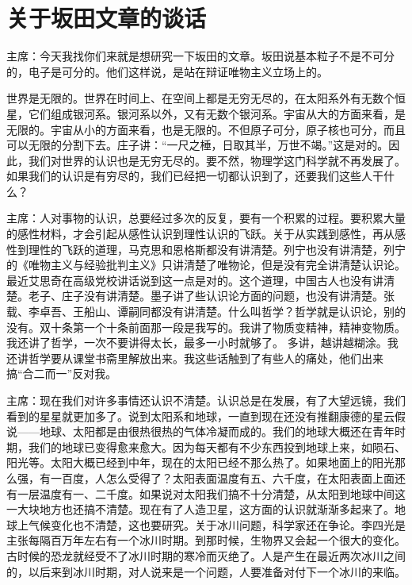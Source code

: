 \section[关于坂田文章的谈话（一九六四年八月二十四日）]{关于坂田文章的谈话}

主席：今天我找你们来就是想研究一下坂田的文章。坂田说基本粒子不是不可分的，电子是可分的。他们这样说，是站在辩证唯物主义立场上的。

世界是无限的。世界在时间上、在空间上都是无穷无尽的，在太阳系外有无数个恒星，它们组成银河系。银河系以外，又有无数个银河系。宇宙从大的方面来看，是无限的。宇宙从小的方面来看，也是无限的。不但原子可分，原子核也可分，而且可以无限的分割下去。庄子讲：“一尺之棰，日取其半，万世不竭。”这是对的。因此，我们对世界的认识也是无穷无尽的。要不然，物理学这门科学就不再发展了。如果我们的认识是有穷尽的，我们已经把一切都认识到了，还要我们这些人干什么？

主席：人对事物的认识，总要经过多次的反复，要有一个积累的过程。要积累大量的感性材料，才会引起从感性认识到理性认识的飞跃。关于从实践到感性，再从感性到理性的飞跃的道理，马克思和恩格斯都没有讲清楚。列宁也没有讲清楚，列宁的《唯物主义与经验批判主义》只讲清楚了唯物论，但是没有完全讲清楚认识论。最近艾思奇在高级党校讲话说到这一点是对的。这个道理，中国古人也没有讲清楚。老子、庄子没有讲清楚。墨子讲了些认识论方面的问题，也没有讲清楚。张载、李卓吾、王船山、谭嗣同都没有讲清楚。什么叫哲学？哲学就是认识论，别的没有。双十条第一个十条前面那一段是我写的。我讲了物质变精神，精神变物质。我还讲了哲学，一次不要讲得太长，最多一小时就够了。 多讲，越讲越糊涂。我还讲哲学要从课堂书斋里解放出来。我这些话触到了有些人的痛处，他们出来搞“合二而一”反对我。

主席：现在我们对许多事情还认识不清楚。认识总是在发展，有了大望远镜，我们看到的星星就更加多了。说到太阳系和地球，一直到现在还没有推翻康德的星云假说——地球、太阳都是由很热很热的气体冷凝而成的。我们的地球大概还在青年时期，我们的地球已变得愈来愈大。因为每天都有不少东西投到地球上来，如陨石、阳光等。太阳大概已经到中年，现在的太阳已经不那么热了。如果地面上的阳光那么强，有一百度，人怎么受得了？太阳表面温度有五、六千度，在太阳表面上面还有一层温度有一、二千度。如果说对太阳我们搞不十分清楚，从太阳到地球中间这一大块地方也还搞不清楚。现在有了人造卫星，这方面的认识就渐渐多起来了。地球上气候变化也不清楚，这也要研究。关于冰川问题，科学家还在争论。李四光是主张每隔百万年左右有一个冰川时期。到那时候，生物界又会起一个很大的变化。古时候的恐龙就经受不了冰川时期的寒冷而灭绝了。人是产生在最近两次冰川之间的，以后来到冰川时期，对人说来是一个问题，人要准备对付下一个冰川的来临。

